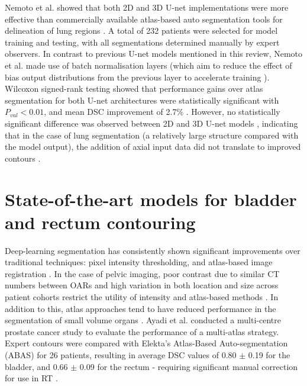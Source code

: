 Nemoto et al. showed that both 2D and 3D U-net implementations were more effective than commercially available atlas-based auto segmentation tools for delineation of lung regions  \cite{Nemoto_2020}. A total of 232 patients were selected for model training and testing, with all segmentations determined manually by expert observers. In contrast to previous U-net models mentioned in this review, Nemoto et al. made use of batch normalisation layers (which aim to reduce the effect of bias output distributions from the previous layer to accelerate training \cite{santurkar2018}). Wilcoxon signed-rank testing showed that performance gains over atlas segmentation for both U-net architectures were statistically significant with $P_{val}<0.01$, and mean DSC improvement of 2.7\% \cite{Nemoto_2020}. However, no statistically significant difference was observed between 2D and 3D U-net models \cite{Nemoto_2020}, indicating that in the case of lung segmentation (a relatively large structure compared with the model output), the addition of axial input data did not translate to improved contours \cite{Nemoto_2020}.
%
%
\section{State-of-the-art models for bladder and rectum contouring}
Deep-learning segmentation has consistently shown significant improvements over traditional techniques: pixel intensity thresholding, and atlas-based image registration \cite{Cardenas2019}. In the case of pelvic imaging, poor contrast due to similar CT numbers between OARs and high variation in both location and size across patient cohorts restrict the utility of intensity and atlas-based methods \cite{acosta2013}. In addition to this, atlas approaches tend to have reduced performance in the segmentation of small volume organs \cite{acosta2013}. Ayadi et al. conducted a multi-centre prostate cancer study to evaluate the performance of a multi-atlas strategy. Expert contours were compared with Elekta's Atlas-Based Auto-segmentation (ABAS) for 26 patients, resulting in average DSC values of 0.80 $\pm$ 0.19 for the bladder, and 0.66 $\pm$ 0.09 for the rectum - requiring significant manual correction for use in RT \cite{Ayadi2011}.

